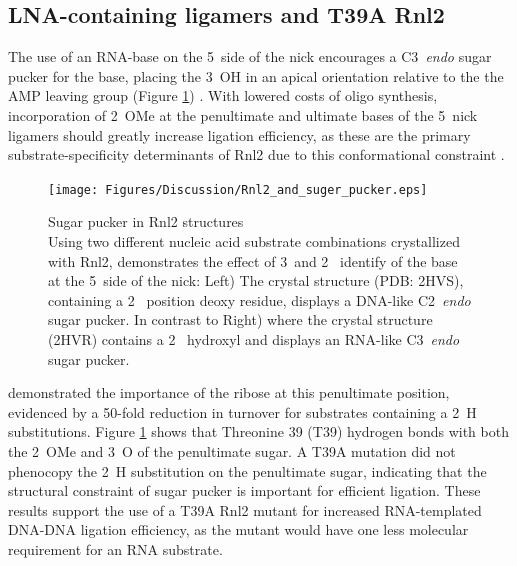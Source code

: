  \subsection{LNA-containing ligamers and T39A Rnl2}
    \label{Disc:subsec:LNA-Containing ligamers and T39A Rnk2}

    The use of an RNA-base on the 5\textprime~side of the nick encourages a C3\textprime~\textit{endo} sugar pucker for the base, placing the 3\textprime~OH in an apical orientation relative to the the AMP leaving group (Figure \ref{Disc:fig:Rnl2 and suger pucker}) \citep{Nandakumar2006}. With lowered costs of oligo synthesis, incorporation of 2\textprime~OMe at the penultimate and ultimate bases of the 5\textprime~nick ligamers should greatly increase ligation efficiency, as these are the primary substrate-specificity determinants of Rnl2 due to this conformational constraint \citep{Nandakumar2004a, Nandakumar2006}.

    \begin{figure} %
      \centering 
      \texttt{[image: Figures/Discussion/Rnl2\_and\_suger\_pucker.eps]}
      \caption[Sugar pucker in Rnl2 structures]
      {Sugar pucker in Rnl2 structures \\[0.25cm]
        Using two different nucleic acid substrate combinations crystallized with Rnl2, \citet{Nandakumar2006} demonstrates the effect of 3\textprime~and 2\textprime~ identify of the base at the 5\textprime~side of the nick: Left) The crystal structure (PDB: 2HVS), containing a 2\textprime~ position deoxy residue, displays a DNA-like C2\textprime~\textit{endo} sugar pucker. In contrast to Right) where the crystal structure (2HVR) contains a 2\textprime~ hydroxyl and displays an RNA-like C3\textprime~\textit{endo} sugar pucker.
        }
        \label{Disc:fig:Rnl2 and suger pucker}
        \end{figure}

    \citet{Nandakumar2004a} demonstrated the importance of the ribose at this penultimate position, evidenced by a 50-fold reduction in turnover for substrates containing a 2\textprime~H substitutions. Figure \ref{Disc:fig:Rnl2 and suger pucker} shows that Threonine 39 (T39) hydrogen bonds with both the 2\textprime~OMe and 3\textprime~O of the penultimate sugar. A T39A mutation did not phenocopy the 2\textprime~H substitution on the penultimate sugar, indicating that the structural constraint of sugar pucker is important for efficient ligation. These results support the use of a T39A Rnl2 mutant for increased RNA-templated DNA-DNA ligation efficiency, as the mutant would have one less molecular requirement for an RNA substrate.

